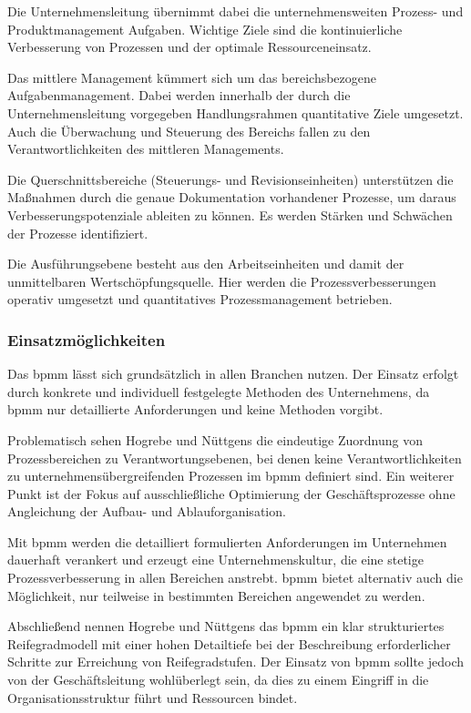 Die Unternehmensleitung übernimmt dabei die unternehmensweiten Prozess- und Produktmanagement Aufgaben. Wichtige Ziele sind die kontinuierliche Verbesserung von Prozessen und der optimale Ressourceneinsatz. \par
Das mittlere Management kümmert sich um das bereichsbezogene Aufgabenmanagement. Dabei werden innerhalb der durch die Unternehmensleitung vorgegeben Handlungsrahmen quantitative Ziele umgesetzt. Auch die Überwachung und Steuerung des Bereichs fallen zu den Verantwortlichkeiten des mittleren Managements.\par
Die Querschnittsbereiche (Steuerungs- und Revisionseinheiten) unterstützen die Maßnahmen durch die genaue Dokumentation vorhandener Prozesse, um daraus Verbesserungspotenziale ableiten zu können. Es werden Stärken und Schwächen der Prozesse identifiziert. \par
Die Ausführungsebene besteht aus den Arbeitseinheiten und damit der unmittelbaren Wertschöpfungsquelle. Hier werden die Prozessverbesserungen operativ umgesetzt und quantitatives Prozessmanagement betrieben.

\subsubsection{Einsatzmöglichkeiten}

Das \acs{bpmm} lässt sich grundsätzlich in allen Branchen nutzen. Der Einsatz erfolgt durch konkrete und individuell festgelegte Methoden des Unternehmens, da \acs{bpmm} nur detaillierte Anforderungen und keine Methoden vorgibt.\par
Problematisch sehen Hogrebe und Nüttgens die eindeutige Zuordnung von Prozessbereichen zu Verantwortungsebenen, bei denen keine Verantwortlichkeiten zu unternehmensübergreifenden Prozessen im \acs{bpmm} definiert sind. Ein weiterer Punkt ist der Fokus auf ausschließliche Optimierung der Geschäftsprozesse ohne Angleichung der Aufbau- und Ablauforganisation.\par
Mit \acs{bpmm} werden die detailliert formulierten Anforderungen im Unternehmen dauerhaft verankert und erzeugt eine Unternehmenskultur, die eine stetige Prozessverbesserung in allen Bereichen anstrebt. \acs{bpmm} bietet alternativ auch die Möglichkeit, nur teilweise in bestimmten Bereichen angewendet zu werden.\par
Abschließend nennen Hogrebe und Nüttgens das \acs{bpmm} ein klar strukturiertes Reifegradmodell mit einer hohen Detailtiefe bei der Beschreibung erforderlicher Schritte zur Erreichung von Reifegradstufen. Der Einsatz von \acs{bpmm} sollte jedoch von der Geschäftsleitung wohlüberlegt sein, da dies zu einem Eingriff in die Organisationsstruktur führt und Ressourcen bindet.
